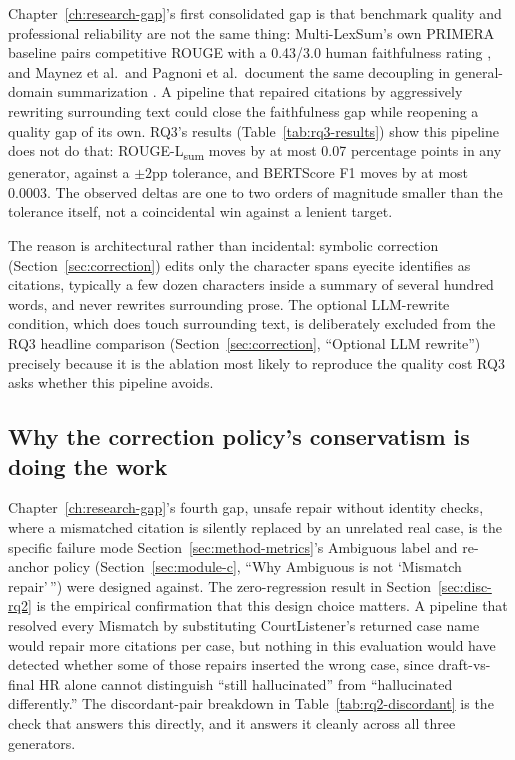 Chapter~\ref{ch:research-gap}'s first consolidated gap is that benchmark quality and professional reliability are not the same thing: Multi-LexSum's own PRIMERA baseline pairs competitive ROUGE with a 0.43/3.0 human faithfulness rating \cite{shen2022multilexsum}, and Maynez et al.\ and Pagnoni et al.\ document the same decoupling in general-domain summarization \cite{maynez2020faithfulness,pagnoni2021factuality}. A pipeline that repaired citations by aggressively rewriting surrounding text could close the faithfulness gap while reopening a quality gap of its own. RQ3's results (Table~\ref{tab:rq3-results}) show this pipeline does not do that: ROUGE-L\textsubscript{sum} moves by at most 0.07 percentage points in any generator, against a $\pm2$pp tolerance, and BERTScore F1 moves by at most 0.0003. The observed deltas are one to two orders of magnitude smaller than the tolerance itself, not a coincidental win against a lenient target.

The reason is architectural rather than incidental: symbolic correction (Section~\ref{sec:correction}) edits only the character spans eyecite identifies as citations, typically a few dozen characters inside a summary of several hundred words, and never rewrites surrounding prose. The optional LLM-rewrite condition, which does touch surrounding text, is deliberately excluded from the RQ3 headline comparison (Section~\ref{sec:correction}, ``Optional LLM rewrite'') precisely because it is the ablation most likely to reproduce the quality cost RQ3 asks whether this pipeline avoids.

\subsection{Why the correction policy's conservatism is doing the work}
\label{sec:disc-rq2-why}

Chapter~\ref{ch:research-gap}'s fourth gap, unsafe repair without identity checks, where a mismatched citation is silently replaced by an unrelated real case, is the specific failure mode Section~\ref{sec:method-metrics}'s Ambiguous label and re-anchor policy (Section~\ref{sec:module-c}, ``Why Ambiguous is not `Mismatch repair'\,'') were designed against. The zero-regression result in Section~\ref{sec:disc-rq2} is the empirical confirmation that this design choice matters. A pipeline that resolved every Mismatch by substituting CourtListener's returned case name would repair more citations per case, but nothing in this evaluation would have detected whether some of those repairs inserted the wrong case, since draft-vs-final HR alone cannot distinguish ``still hallucinated'' from ``hallucinated differently.'' The discordant-pair breakdown in Table~\ref{tab:rq2-discordant} is the check that answers this directly, and it answers it cleanly across all three generators.


